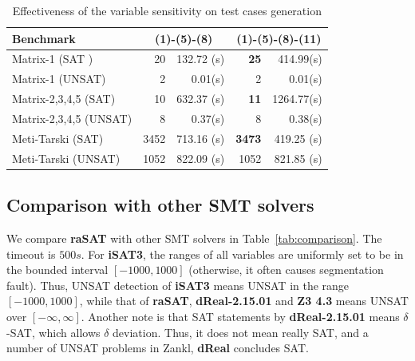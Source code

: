 \documentclass[runningheads,a4paper,oribibl]{llncs}
\begin{document}
\vspace{-0.5cm}

\begin{table}[ht]
\begin{center}
\begin{tabular}{ | l | r | r | r | r |}
\hline
    \multicolumn{1}{|l|}{Benchmark} & \multicolumn{2}{c|}{(1)-(5)-(8)} &
    \multicolumn{2}{c|}{(1)-(5)-(8)-(11)} \\
\hline
    Matrix-1 (SAT ) & 20 & 132.72 (s) & \textbf{25} & 414.99(s)
\\
\hline
    Matrix-1 (UNSAT) & 2 & 0.01(s) & 2 & 0.01(s)
\\
\hline
	Matrix-2,3,4,5 (SAT) & 10 & 632.37 (s) & \textbf{11} & 1264.77(s)
\\
\hline
    Matrix-2,3,4,5 (UNSAT) & 8 & 0.37(s) & 8 & 0.38(s)
\\ \hline
    Meti-Tarski (SAT) & 3452 & 713.16 (s) & \textbf{3473} & 419.25 (s)
\\
\hline
    Meti-Tarski (UNSAT) & 1052 & 822.09 (s) & 1052 & 821.85 (s)
\\
\hline
\end{tabular}
\end{center}
\caption{Effectiveness of the variable sensitivity on test cases generation} 
\label{tab:test-sen}
\end{table}


\vspace{-1cm}


\subsection{Comparison with other SMT solvers}

We compare {\bf raSAT} with other SMT solvers in Table~\ref{tab:comparison}.
The timeout is $500s$. 
For {\bf iSAT3}, the ranges of all variables are uniformly set to be in the bounded interval
$[-1000, 1000]$ (otherwise, it often causes segmentation fault). 
Thus, UNSAT detection of {\bf iSAT3} means UNSAT in the range $[-1000, 1000]$, 
while that of {\bf raSAT}, \textbf{dReal-2.15.01} and {\bf Z3 4.3} means UNSAT over $[-\infty, \infty]$.
Another note is that SAT statements by \textbf{dReal-2.15.01} means $\delta$-SAT, which allows
$\delta$ deviation. Thus, it does not mean really SAT, and a number of UNSAT problems in
Zankl, \textbf{dReal} concludes SAT.
\end{document}
